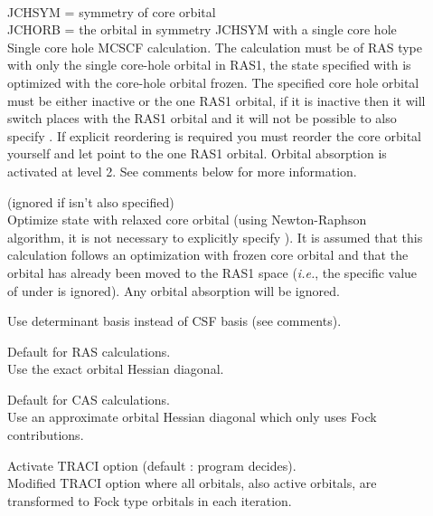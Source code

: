 \begin{description}
\item[]
   \\
  JCHSYM = symmetry of core orbital\\
  JCHORB = the orbital in symmetry JCHSYM with a single core hole\\
  Single core hole MCSCF calculation. The calculation must be of RAS type
  with only the single core-hole orbital in RAS1, the state specified with
   is optimized with the core-hole orbital
  frozen.
  The specified core hole orbital must be either inactive or
  the one RAS1 orbital, if it is inactive then it will switch places with
  the RAS1 orbital and it will not be possible to also
  specify . If explicit reordering is required you must reorder
  the core orbital yourself and let  point to the one RAS1 orbital.
  Orbital absorption is activated at level 2. See comments below for more information.

\item[]
  (ignored if  isn't also specified)\\
  Optimize state with relaxed core orbital (using Newton-Raphson algorithm,
  it is not necessary to explicitly specify ).
  It is assumed that this calculation follows an optimization
  with frozen core orbital and that the orbital has already been
  moved to the RAS1 space ({\it i.e.\/}, the specific value of
   under  is ignored). Any
  orbital absorption   will be ignored.

\item[]
  Use determinant basis instead of CSF basis (see comments).

\item[]
  Default for RAS calculations.\\
  Use the exact orbital Hessian diagonal.

\item[]
  Default for CAS calculations.\\
  Use an approximate orbital Hessian diagonal which only uses Fock
  contributions.

\item[]
  Activate TRACI option (default : program decides).\\
  Modified TRACI option where all orbitals, also active orbitals, are
  transformed to Fock type orbitals in each iteration.


\end{description}
